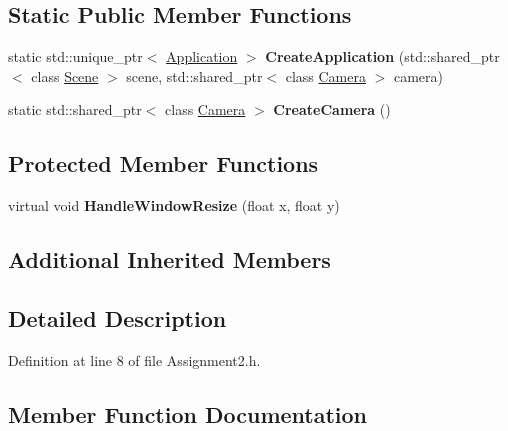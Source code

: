 \subsection*{Static Public Member Functions}
\begin{DoxyCompactItemize}
\item 
\hypertarget{class_assignment2_ae4f0035275d5be2c053a598fbe3209e6}{}static std\+::unique\+\_\+ptr$<$ \hyperlink{class_application}{Application} $>$ {\bfseries Create\+Application} (std\+::shared\+\_\+ptr$<$ class \hyperlink{class_scene}{Scene} $>$ scene, std\+::shared\+\_\+ptr$<$ class \hyperlink{class_camera}{Camera} $>$ camera)\label{class_assignment2_ae4f0035275d5be2c053a598fbe3209e6}

\item 
\hypertarget{class_assignment2_a285e6d6ff330c03e28e49660ec178fa4}{}static std\+::shared\+\_\+ptr$<$ class \hyperlink{class_camera}{Camera} $>$ {\bfseries Create\+Camera} ()\label{class_assignment2_a285e6d6ff330c03e28e49660ec178fa4}

\end{DoxyCompactItemize}
\subsection*{Protected Member Functions}
\begin{DoxyCompactItemize}
\item 
\hypertarget{class_assignment2_a1af734567de5e8e73a2fd726fe3914f2}{}virtual void {\bfseries Handle\+Window\+Resize} (float x, float y)\label{class_assignment2_a1af734567de5e8e73a2fd726fe3914f2}

\end{DoxyCompactItemize}
\subsection*{Additional Inherited Members}


\subsection{Detailed Description}


Definition at line 8 of file Assignment2.\+h.



\subsection{Member Function Documentation}
\hypertarget{class_assignment2_ae7ae8c9e7eb64cf9661d9ddb1992f314}{}
